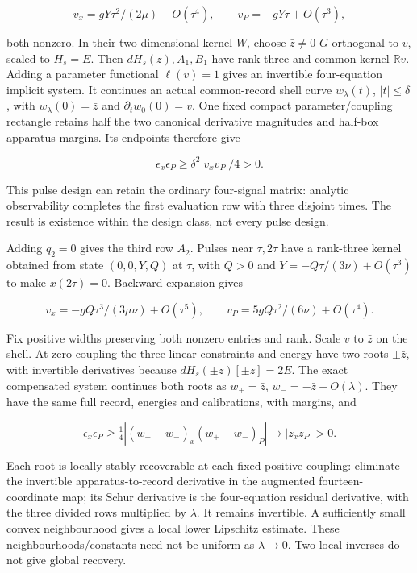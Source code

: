 \documentclass[11pt,a4paper]{article}
\begin{document}
\[v_x=gY\tau^2/(2\mu)+O(\tau^4),\qquad
v_P=-gY\tau+O(\tau^3),\]

both nonzero. In their two-dimensional kernel \(W\), choose
\(\bar z\ne0\) \(G\)-orthogonal to \(v\), scaled to \(H_s=E\). Then
\(dH_s(\bar z),A_1,B_1\) have rank three and common kernel
\(\mathbb Rv\). Adding a parameter functional \(\ell(v)=1\) gives an
invertible four-equation implicit system. It continues an actual
common-record shell curve \(w_\lambda(t)\), \(|t|\le\delta\), with
\(w_\lambda(0)=\bar z\) and \(\partial_tw_0(0)=v\). One fixed compact
parameter/coupling rectangle retains half the two canonical derivative
magnitudes and half-box apparatus margins. Its endpoints therefore give

\[\epsilon_x\epsilon_P\ge\delta^2|v_xv_P|/4>0.\]

This pulse design can retain the ordinary four-signal matrix: analytic
observability completes the first evaluation row with three disjoint
times. The result is existence within the design class, not every pulse
design.

Adding \(q_2=0\) gives the third row \(A_2\). Pulses near \(\tau,2\tau\)
have a rank-three kernel obtained from state \((0,0,Y,Q)\) at \(\tau\),
with \(Q>0\) and \(Y=-Q\tau/(3\nu)+O(\tau^3)\) to make \(x(2\tau)=0\).
Backward expansion gives

\[v_x=-gQ\tau^3/(3\mu\nu)+O(\tau^5),\qquad
v_P=5gQ\tau^2/(6\nu)+O(\tau^4).\]

Fix positive widths preserving both nonzero entries and rank. Scale
\(v\) to \(\bar z\) on the shell. At zero coupling the three linear
constraints and energy have two roots \(\pm\bar z\), with invertible
derivatives because \(dH_s(\pm\bar z)[\pm\bar z]=2E\). The exact
compensated system continues both roots as \(w_+=\bar z\),
\(w_-=-\bar z+O(\lambda)\). They have the same full record, energies and
calibrations, with margins, and

\[\epsilon_x\epsilon_P\ge\tfrac14|(w_+-w_-)_x(w_+-w_-)_P|
 \longrightarrow|\bar z_x\bar z_P|>0.\]

Each root is locally stably recoverable at each fixed positive coupling:
eliminate the invertible apparatus-to-record derivative in the augmented
fourteen-coordinate map; its Schur derivative is the four-equation
residual derivative, with the three divided rows multiplied by
\(\lambda\). It remains invertible. A sufficiently small convex
neighbourhood gives a local lower Lipschitz estimate. These
neighbourhoods/constants need not be uniform as \(\lambda\to0\). Two
local inverses do not give global recovery.
\end{document}
